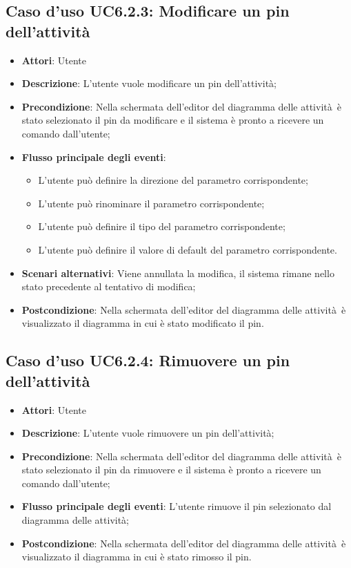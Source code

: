 \documentclass[../AnalisiDeiRequisiti.tex]{subfiles}
\begin{document}
				\subsection{Caso d'uso UC6.2.3: Modificare un pin dell'attività}
				\begin{itemize}
					\item \textbf{Attori}: Utente
					\item \textbf{Descrizione}: L'utente vuole modificare un pin dell'attività;
					\item \textbf{Precondizione}: Nella schermata dell'editor del diagramma delle attività è stato selezionato il pin da modificare e il sistema è pronto a ricevere un comando dall'utente;
					\item \textbf{Flusso principale degli eventi}: \begin{itemize}
					\item L'utente può definire la direzione del parametro corrispondente;
					\item L'utente può rinominare il parametro corrispondente;
					\item L'utente può definire il tipo del parametro corrispondente;
					\item L'utente può definire il valore di default del parametro corrispondente.
				\end{itemize}
					\item \textbf{Scenari alternativi}: Viene annullata la modifica, il sistema rimane nello stato precedente al tentativo di modifica;
					\item \textbf{Postcondizione}: Nella schermata dell'editor del diagramma delle attività è visualizzato il diagramma in cui è stato modificato il pin.
				\end{itemize}
				\subsection{Caso d'uso UC6.2.4: Rimuovere un pin dell'attività}
				\begin{itemize}
					\item \textbf{Attori}: Utente
					\item \textbf{Descrizione}: L'utente vuole rimuovere un pin dell'attività;
					\item \textbf{Precondizione}: Nella schermata dell'editor del diagramma delle attività è stato selezionato il pin da rimuovere e il sistema è pronto a ricevere un comando dall'utente;
					\item \textbf{Flusso principale degli eventi}: L'utente rimuove il pin selezionato dal diagramma delle attività;
					\item \textbf{Postcondizione}: Nella schermata dell'editor del diagramma delle attività è visualizzato il diagramma in cui è stato rimosso il pin.
				\end{itemize}
\end{document}
